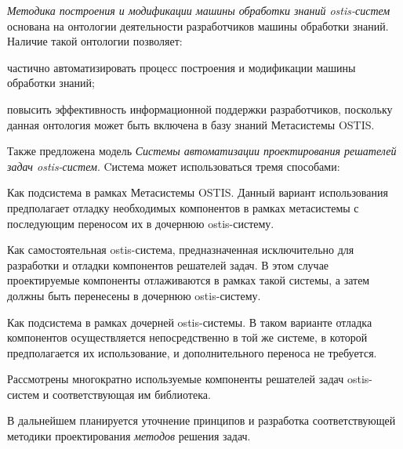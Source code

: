 \textit{Методика построения и модификации машины обработки знаний ostis-систем} основана на онтологии деятельности разработчиков машины обработки знаний. Наличие такой онтологии позволяет:
\begin{textitemize}
    \item частично автоматизировать процесс построения и модификации машины обработки знаний;
    \item повысить эффективность информационной поддержки разработчиков, поскольку данная онтология может быть включена в базу знаний Метасистемы OSTIS.
\end{textitemize}

Также предложена модель \textit{Системы автоматизации проектирования решателей задач ostis-систем}. Cистема может использоваться тремя способами:
\begin{textitemize}
    \item Как подсистема в рамках Метасистемы OSTIS. Данный вариант использования предполагает отладку необходимых компонентов в рамках метасистемы с последующим переносом их в дочернюю ostis-систему.
    \item Как самостоятельная ostis-система, предназначенная исключительно для разработки и отладки компонентов решателей задач. В этом случае проектируемые компоненты отлаживаются в рамках такой системы, а затем должны быть перенесены в дочернюю ostis-систему.
    \item Как подсистема в рамках дочерней ostis-системы. В таком варианте отладка компонентов осуществляется непосредственно в той же системе, в которой предполагается их использование, и дополнительного переноса не требуется.
\end{textitemize}

Рассмотрены многократно используемые компоненты решателей задач ostis-систем и соответствующая им библиотека.

В дальнейшем планируется уточнение принципов и разработка соответствующей методики проектирования \textit{методов} решения задач.

%